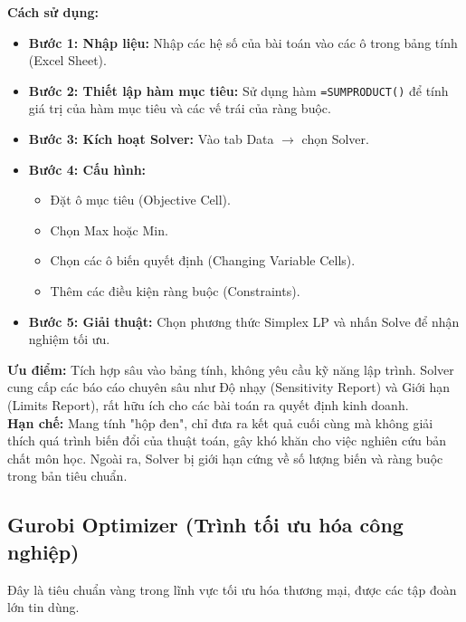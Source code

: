 \documentclass[12pt,a4paper]{article}
\begin{document}
\medskip
\noindent\textbf{Cách sử dụng:}
\begin{itemize}[label=\textcolor{secondary}{$\circ$}]
    \item \textbf{Bước 1: Nhập liệu:} Nhập các hệ số của bài toán vào các ô trong bảng tính (Excel Sheet).
    \item \textbf{Bước 2: Thiết lập hàm mục tiêu:} Sử dụng hàm \texttt{=SUMPRODUCT()} để tính giá trị của hàm mục tiêu và các vế trái của ràng buộc.
    \item \textbf{Bước 3: Kích hoạt Solver:} Vào tab Data $\rightarrow$ chọn Solver.
    \item \textbf{Bước 4: Cấu hình:} 
    \begin{itemize}
        \item Đặt ô mục tiêu (Objective Cell).
        \item Chọn Max hoặc Min.
        \item Chọn các ô biến quyết định (Changing Variable Cells).
        \item Thêm các điều kiện ràng buộc (Constraints).
    \end{itemize}
    \item \textbf{Bước 5: Giải thuật:} Chọn phương thức Simplex LP và nhấn Solve để nhận nghiệm tối ưu.
\end{itemize}
\textbf{Ưu điểm:} Tích hợp sâu vào bảng tính, không yêu cầu kỹ năng lập trình. Solver cung cấp các báo cáo chuyên sâu như Độ nhạy (Sensitivity Report) và Giới hạn (Limits Report), rất hữu ích cho các bài toán ra quyết định kinh doanh.\\
\textbf{Hạn chế:} Mang tính "hộp đen", chỉ đưa ra kết quả cuối cùng mà không giải thích quá trình biến đổi của thuật toán, gây khó khăn cho việc nghiên cứu bản chất môn học. Ngoài ra, Solver bị giới hạn cứng về số lượng biến và ràng buộc trong bản tiêu chuẩn.

\subsection{Gurobi Optimizer (Trình tối ưu hóa công nghiệp)}
Đây là tiêu chuẩn vàng trong lĩnh vực tối ưu hóa thương mại, được các tập đoàn lớn tin dùng.
\end{document}
